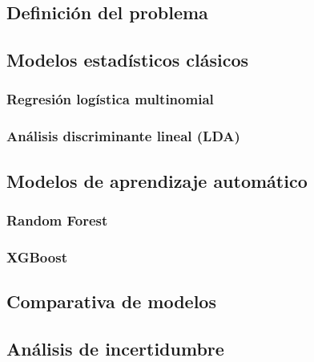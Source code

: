 \documentclass[12pt, a4paper]{article}
\begin{document}
\subsection{Definición del problema}

\subsection{Modelos estadísticos clásicos}

\subsubsection{Regresión logística multinomial}

\subsubsection{Análisis discriminante lineal (LDA)}

\subsection{Modelos de aprendizaje automático}

\subsubsection{Random Forest}

\subsubsection{XGBoost}

\subsection{Comparativa de modelos}

\subsection{Análisis de incertidumbre}
\end{document}
